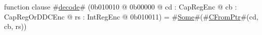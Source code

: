 function clause #\hyperref[sailMIPSzdecode]{decode}# (0b010010 @ 0b00000 @ cd : CapRegEnc @ cb : CapRegOrDDCEnc @ rs : IntRegEnc @ 0b010011) = #\hyperref[sailMIPSzSome]{Some}#(#\hyperref[sailMIPSzCFromPtr]{CFromPtr}#(cd, cb, rs))
